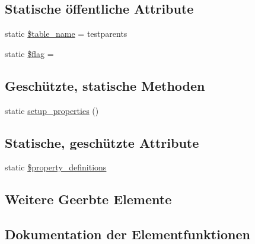 \subsection*{Statische öffentliche Attribute}
\begin{DoxyCompactItemize}
\item 
static \hyperlink{classSunhill_1_1Test_1_1ts__testparent_a00912adf37a3dcf070984bcb9f135397}{\$table\+\_\+name} = \textquotesingle{}testparents\textquotesingle{}
\item 
static \hyperlink{classSunhill_1_1Test_1_1ts__testparent_a9d9eec416bc932c5dfc7bd2788cb1f42}{\$flag} = \textquotesingle{}\textquotesingle{}
\end{DoxyCompactItemize}
\subsection*{Geschützte, statische Methoden}
\begin{DoxyCompactItemize}
\item 
static \hyperlink{classSunhill_1_1Test_1_1ts__testparent_a9e3df7d99073d53c3b6c86d18a1e89ee}{setup\+\_\+properties} ()
\end{DoxyCompactItemize}
\subsection*{Statische, geschützte Attribute}
\begin{DoxyCompactItemize}
\item 
static \hyperlink{classSunhill_1_1Test_1_1ts__testparent_a170b80442e199c985bfd5d9be14936eb}{\$property\+\_\+definitions}
\end{DoxyCompactItemize}
\subsection*{Weitere Geerbte Elemente}


\subsection{Dokumentation der Elementfunktionen}
\mbox{\label{classSunhill_1_1Test_1_1ts__testparent_ae36451408fb8bb3cba6fed8bb167d4fa}} 
